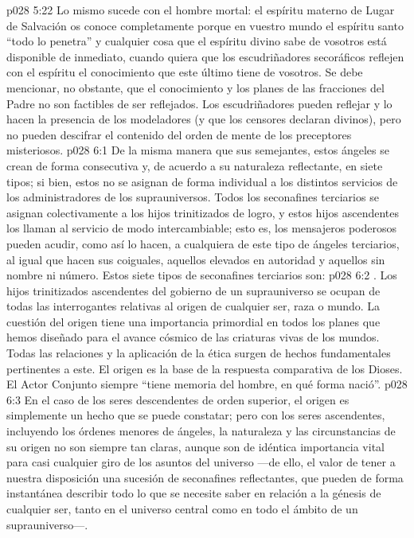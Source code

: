 \vs p028 5:22 Lo mismo sucede con el hombre mortal: el espíritu materno de Lugar de Salvación os conoce completamente porque en vuestro mundo el espíritu santo “todo lo penetra” y cualquier cosa que el espíritu divino sabe de vosotros está disponible de inmediato, cuando quiera que los escudriñadores secoráficos reflejen con el espíritu el conocimiento que este último tiene de vosotros. Se debe mencionar, no obstante, que el conocimiento y los planes de las fracciones del Padre no son factibles de ser reflejados. Los escudriñadores pueden reflejar y lo hacen la presencia de los modeladores (y que los censores declaran divinos), pero no pueden descifrar el contenido del orden de mente de los preceptores misteriosos.
\vs p028 6:1 De la misma manera que sus semejantes, estos ángeles se crean de forma consecutiva y, de acuerdo a su naturaleza reflectante, en siete tipos; si bien, estos no se asignan de forma individual a los distintos servicios de los administradores de los suprauniversos. Todos los seconafines terciarios se asignan colectivamente a los hijos trinitizados de logro, y estos hijos ascendentes los llaman al servicio de modo intercambiable; esto es, los mensajeros poderosos pueden acudir, como así lo hacen, a cualquiera de este tipo de ángeles terciarios, al igual que hacen sus coiguales, aquellos elevados en autoridad y aquellos sin nombre ni número. Estos siete tipos de seconafines terciarios son:
\vs p028 6:2 . Los hijos trinitizados ascendentes del gobierno de un suprauniverso se ocupan de todas las interrogantes relativas al origen de cualquier ser, raza o mundo. La cuestión del origen tiene una importancia primordial en todos los planes que hemos diseñado para el avance cósmico de las criaturas vivas de los mundos. Todas las relaciones y la aplicación de la ética surgen de hechos fundamentales pertinentes a este. El origen es la base de la respuesta comparativa de los Dioses. El Actor Conjunto siempre “tiene memoria del hombre, en qué forma nació”.
\vs p028 6:3 En el caso de los seres descendentes de orden superior, el origen es simplemente un hecho que se puede constatar; pero con los seres ascendentes, incluyendo los órdenes menores de ángeles, la naturaleza y las circunstancias de su origen no son siempre tan claras, aunque son de idéntica importancia vital para casi cualquier giro de los asuntos del universo ---de ello, el valor de tener a nuestra disposición una sucesión de seconafines reflectantes, que pueden de forma instantánea describir todo lo que se necesite saber en relación a la génesis de cualquier ser, tanto en el universo central como en todo el ámbito de un suprauniverso---.
